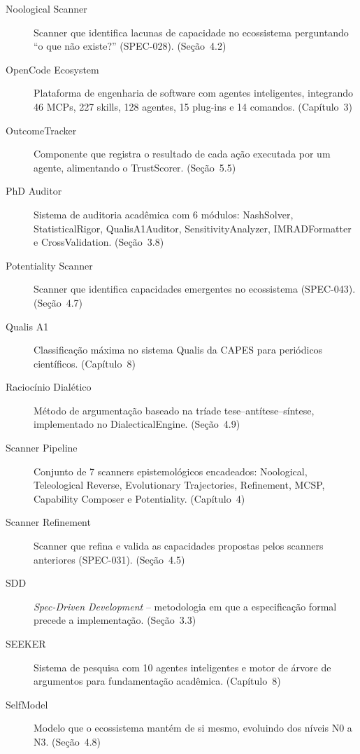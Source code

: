 \begin{description}
\item[Noological Scanner] Scanner que identifica lacunas de capacidade
no ecossistema perguntando ``o que não existe?'' (SPEC-028).
(Seção~4.2)

\item[OpenCode Ecosystem] Plataforma de engenharia de software com
agentes inteligentes, integrando 46 MCPs, 227 skills, 128 agentes,
15 plug-ins e 14 comandos. (Capítulo~3)

\item[OutcomeTracker] Componente que registra o resultado de cada ação
executada por um agente, alimentando o TrustScorer. (Seção~5.5)

\item[PhD Auditor] Sistema de auditoria acadêmica com 6 módulos:
NashSolver, StatisticalRigor, QualisA1Auditor, SensitivityAnalyzer,
IMRADFormatter e CrossValidation. (Seção~3.8)

\item[Potentiality Scanner] Scanner que identifica capacidades
emergentes no ecossistema (SPEC-043). (Seção~4.7)

\item[Qualis A1] Classificação máxima no sistema Qualis da CAPES para
periódicos científicos. (Capítulo~8)

\item[Raciocínio Dialético] Método de argumentação baseado na tríade
tese--antítese--síntese, implementado no DialecticalEngine.
(Seção~4.9)

\item[Scanner Pipeline] Conjunto de 7 scanners epistemológicos
encadeados: Noological, Teleological Reverse, Evolutionary Trajectories,
Refinement, MCSP, Capability Composer e Potentiality. (Capítulo~4)

\item[Scanner Refinement] Scanner que refina e valida as capacidades
propostas pelos scanners anteriores (SPEC-031). (Seção~4.5)

\item[SDD] \emph{Spec-Driven Development} -- metodologia em que a
especificação formal precede a implementação. (Seção~3.3)

\item[SEEKER] Sistema de pesquisa com 10 agentes inteligentes e motor
de árvore de argumentos para fundamentação acadêmica.
(Capítulo~8)

\item[SelfModel] Modelo que o ecossistema mantém de si mesmo,
evoluindo dos níveis N0 a N3. (Seção~4.8)


\end{description}
